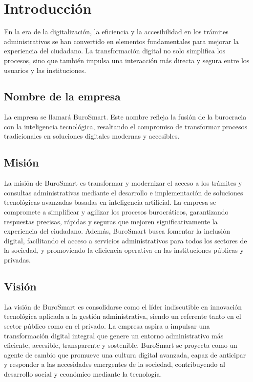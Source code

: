 \section{Introducción}
En la era de la digitalización, la eficiencia y la accesibilidad en los trámites administrativos se han convertido en elementos fundamentales para mejorar la experiencia del ciudadano. La transformación digital no solo simplifica los procesos, sino que también impulsa una interacción más directa y segura entre los usuarios y las instituciones.


\subsection{Nombre de la empresa}
La empresa se llamará BuroSmart. Este nombre refleja la fusión de la burocracia con la inteligencia tecnológica, resaltando el compromiso de transformar procesos tradicionales en soluciones digitales modernas y accesibles.

\subsection{Misión}
La misión de BuroSmart es transformar y modernizar el acceso a los trámites y consultas administrativas mediante el desarrollo e implementación de soluciones tecnológicas avanzadas basadas en inteligencia artificial. La empresa se compromete a simplificar y agilizar los procesos burocráticos, garantizando respuestas precisas, rápidas y seguras que mejoren significativamente la experiencia del ciudadano. Además, BuroSmart busca fomentar la inclusión digital, facilitando el acceso a servicios administrativos para todos los sectores de la sociedad, y promoviendo la eficiencia operativa en las instituciones públicas y privadas.

\subsection{Visión}
La visión de BuroSmart es consolidarse como el líder indiscutible en innovación tecnológica aplicada a la gestión administrativa, siendo un referente tanto en el sector público como en el privado. La empresa aspira a impulsar una transformación digital integral que genere un entorno administrativo más eficiente, accesible, transparente y sostenible. BuroSmart se proyecta como un agente de cambio que promueve una cultura digital avanzada, capaz de anticipar y responder a las necesidades emergentes de la sociedad, contribuyendo al desarrollo social y económico mediante la tecnología.

